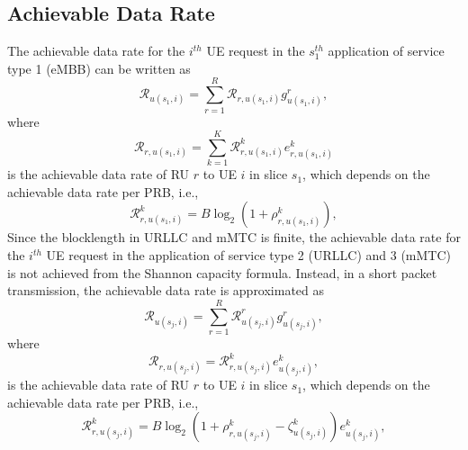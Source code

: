 \documentclass[lettersize,journal]{IEEEtran}
\begin{document}
\subsection{Achievable Data Rate}
\vspace{-1mm}
The achievable data rate for the $i^{th}$ UE request in the $s_{1}^{th}$ application of service type 1 (eMBB) can be written as 
\begin{equation}\label{eq3}
\mathcal{R}_{u(s_1,i)} = \sum_{r=1}^{R}\mathcal{R}_{r,u(s_1,i)} g^r_{u(s_1,i)},
\end{equation}
where
\begin{equation}
\mathcal{R}_{r, u(s_1,i)} = \sum_{k=1}^{K} \mathcal{{R}}_{r,u(s_1,i)}^{k} e^k_{r,u(s_1,i)}
\end{equation}
is the achievable data rate of RU $r$ to UE $i$ in slice $s_1$, which depends on the achievable data rate per PRB, i.e.,
\begin{equation}
\mathcal{{R}}_{r,u(s_1,i)}^{k} =  B \log_2({1+ \rho_{r,u(s_1,i)}^{k}}),
\end{equation}
Since the blocklength in URLLC and mMTC is finite, the achievable data rate for the $i^{th}$ UE request in the application of service type 2 (URLLC) and 3 (mMTC) is not achieved from the Shannon capacity formula. Instead, in a short packet transmission, the achievable data rate is approximated as \cite{setayesh2020joint}
\begin{equation}\label{eq11}
\mathcal{R}_{u(s_j,i)} = \sum_{r=1}^{R}\mathcal{R}_{u(s_j,i)}^{r} g^r_{u(s_j,i)},
\end{equation}
where
\begin{equation}
\mathcal{R}_{r,u(s_j,i)} = \mathcal{{R}}_{r,u(s_j,i)}^{k}{e}_{u(s_j,i)}^{k},
\end{equation}
is the achievable data rate of RU $r$ to UE $i$ in slice $s_1$, which depends on the achievable data rate per PRB, i.e.,
\begin{equation}
\mathcal{{R}}_{r,u(s_j,i)}^{k} = B \log_2({1+ \rho_{r,u(s_j,i)}^{k}} - \zeta_{u(s_j,i)}^{k}){e}_{u(s_j,i)}^{k},
\end{equation}
\end{document}

